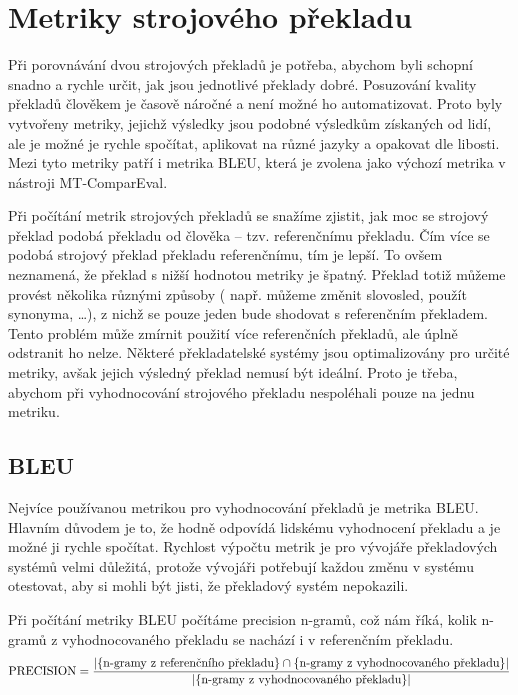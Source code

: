 \chapter{Metriky strojového překladu}
\label{chap:metrics}

Při porovnávání dvou strojových překladů je potřeba,
  abychom byli schopní snadno a rychle určit,
  jak jsou jednotlivé překlady dobré.
Posuzování kvality překladů člověkem je časově náročné
  a není možné ho automatizovat.
Proto byly vytvořeny metriky,
  jejichž výsledky jsou podobné výsledkům získaných od lidí,
  ale je možné je rychle spočítat,
  aplikovat na různé jazyky a opakovat dle libosti.
Mezi tyto metriky patří i metrika BLEU,
  která je zvolena jako výchozí metrika v nástroji MT-ComparEval.

Při počítání metrik strojových překladů se snažíme zjistit,
  jak moc se strojový překlad podobá překladu od člověka -- tzv. referenčnímu překladu.
Čím více se podobá strojový překlad překladu referenčnímu,
  tím je lepší.
To ovšem neznamená, že překlad s nižší hodnotou metriky je špatný.
Překlad totiž můžeme provést několika různými způsoby 
  ( např. můžeme změnit slovosled, použít synonyma, \dots ),
  z nichž se pouze jeden bude shodovat s referenčním překladem.
Tento problém může zmírnit použití více referenčních překladů,
  ale úplně odstranit ho nelze.
Některé překladatelské systémy jsou optimalizovány pro určité metriky,
  avšak jejich výsledný překlad nemusí být ideální.
Proto je třeba,
  abychom při vyhodnocování strojového překladu nespoléhali pouze na jednu metriku.


\section{BLEU}
Nejvíce používanou metrikou pro vyhodnocování překladů je metrika BLEU.
Hlavním důvodem je to,
  že hodně odpovídá lidskému vyhodnocení překladu
  a je možné ji rychle spočítat.
Rychlost výpočtu metrik je pro vývojáře překladových systémů velmi důležitá,
  protože vývojáři potřebují každou změnu v systému otestovat,
  aby si mohli být jisti,
  že překladový systém nepokazili.

Při počítání metriky BLEU počítáme precision \mbox{n-gramů},
  což nám říká,
  kolik \mbox{n-gramů} z vyhodnocovaného překladu se nachází i v referenčním překladu.	
$$ \text{PRECISION} = \frac{\lvert \lbrace \text{\mbox{n-gramy} z referenčního překladu} \rbrace \cap \lbrace \text{\mbox{n-gramy} z vyhodnocovaného překladu} \rbrace \rvert}{\lvert \lbrace \text{\mbox{n-gramy} z vyhodnocovaného překladu} \rbrace \rvert}$$

